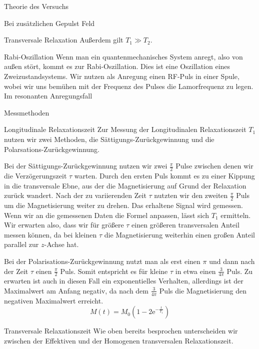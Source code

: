 \documentclass[pdftex, a4paper,11pt, twoside, ngerman]{report}
\begin{document}
\begin{chapter}{Theorie des Versuchs}
\begin{section}{Bei zusätzlichen Gepulst Feld}
\begin{subsection}{Transversale Relaxation}
            Außerdem gilt $T_1 \gg T_2$.
        \end{subsection}

        \begin{subsection}{Rabi-Oszillation}
            Wenn man ein quantenmechanisches System anregt, also von außen stört, kommt es zur Rabi-Oszillation.
            Dies ist eine Oszillation eines Zweizustandsystems.
            Wir nutzen als Anregung einen RF-Puls in einer Spule, wobei wir uns bemühen mit der Frequenz des Pulses die Lamorfrequenz zu legen.
            Im resonanten Anregungsfall 

        \end{subsection}
    \end{section}

    \begin{section}{Messmethoden}
        \begin{subsection}{Longitudinale Relaxationszeit}
            Zur Messung der Longitudinalen Relaxationszeit $T_1$ nutzen wir zwei Methoden, die Sättigungs-Zurückgewinnung und die Polarsations-Zurückgewinnung.

            Bei der Sättigungs-Zurückgewinnung nutzen wir zwei $\frac \pi 2$ Pulse zwischen denen wir die Verzögerungszeit $\tau$ warten.
            Durch den ersten Puls kommt es zu einer Kippung in die transversale Ebne, aus der die Magnetisierung auf Grund der Relaxation zurück wandert. 
            Nach der zu variierenden Zeit $\tau$ nutzten wir den zweiten $\frac \pi 2$ Puls um die Magnetisierung weiter zu drehen.
            Das erhaltene Signal wird gemessen.
            Wenn wir an die gemessenen Daten die Formel 
            anpassen, lässt sich $T_1$ ermitteln.
            Wir erwarten also, dass wir für größere $\tau$ einen größeren transversalen Anteil messen können, da bei kleinen $\tau$ die Magnetisierung weiterhin einen großen Anteil parallel zur $z$-Achse hat.

            Bei der Polarisations-Zurückgewinnung nutzt man als erst einen $\pi$ und dann nach der Zeit $\tau$ einen $\frac \pi 2$ Puls. 
            Somit entspricht es für kleine $\tau$ in etwa einen $\frac 3{4\pi}$ Puls.
            Zu erwarten ist auch in diesen Fall ein exponentielles Verhalten, allerdings ist der Maximalwert am Anfang negativ, da nach dem $\frac 3{4\pi}$ Puls die Magnetisierung den negativen Maximalwert erreicht.
            \[
                M(t) = M_0\left( 1-2\mathrm e^{-\frac t{T_1}}\right)
            \]

        \end{subsection}

        \begin{subsection}{Transversale Relaxationszeit}
            Wie oben bereits besprochen unterscheiden wir zwischen der Effektiven und der Homogenen transversalen Relaxationszeit.


        \end{subsection}

    \end{section}
    
  \end{chapter}
\end{document}
